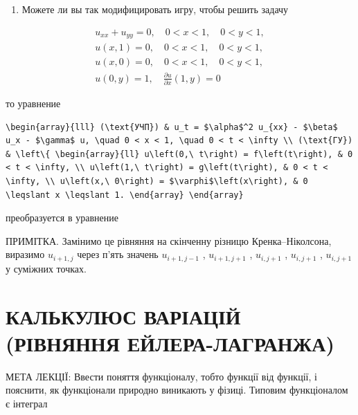 \documentclass[
  ukrainian,
]{article}
\providecommand{\tightlist}{%
  \setlength{\itemsep}{0pt}\setlength{\parskip}{0pt}}
\begin{document}
\begin{enumerate}
\def\labelenumi{\arabic{enumi}.}
\setcounter{enumi}{3}
\tightlist
\item
  Можете ли вы так модифицировать игру, чтобы решить задачу
\end{enumerate}

\[
\begin{array}{l} u_{xx} + u_{yy} = 0, \quad 0 < x < 1, \quad 0 < y < 1, \\ u(x, 1) = 0, \quad 0 < x < 1, \quad 0 < y < 1, \\ u(x, 0) = 0, \quad 0 < x < 1, \quad 0 < y < 1, \\ u(0, y) = 1, \quad \frac{\partial u}{\partial x}(1, y) = 0 \end{array}
\]

то уравнение

\begin{verbatim}
\begin{array}{lll} (\text{УЧП}) & u_t = $\alpha$^2 u_{xx} - $\beta$ u_x - $\gamma$ u, \quad 0 < x < 1, \quad 0 < t < \infty \\ (\text{ГУ}) & \left\{ \begin{array}{ll} u\left(0,\ t\right) = f\left(t\right), & 0 < t < \infty, \\ u\left(1,\ t\right) = g\left(t\right), & 0 < t < \infty, \\ u\left(x,\ 0\right) = $\varphi$\left(x\right), & 0 \leqslant x \leqslant 1. \end{array} \end{array}
\end{verbatim}

преобразуется в уравнение

ПРИМІТКА. Замінимо це рівняння на скінченну різницю Кренка--Ніколсона,
виразимо \(u_{i+1,j}\) через п'ять значень \(u_{i+1,j-1}\) ,
\(u_{i+1,j+1}\) , \(u_{i,j+1}\) , \(u_{i,j+1}\) , \(u_{i,j+1}\) у
суміжних точках.

\section{КАЛЬКУЛЮС ВАРІАЦІЙ (РІВНЯННЯ
ЕЙЛЕРА-ЛАГРАНЖА)}\label{ux43aux430ux43bux44cux43aux443ux43bux44eux441-ux432ux430ux440ux456ux430ux446ux456ux439-ux440ux456ux432ux43dux44fux43dux43dux44f-ux435ux439ux43bux435ux440ux430-ux43bux430ux433ux440ux430ux43dux436ux430}

МЕТА ЛЕКЦІЇ: Ввести поняття функціоналу, тобто функції від функції, і
пояснити, як функціонали природно виникають у фізиці. Типовим
функціоналом є інтеграл
\end{document}
